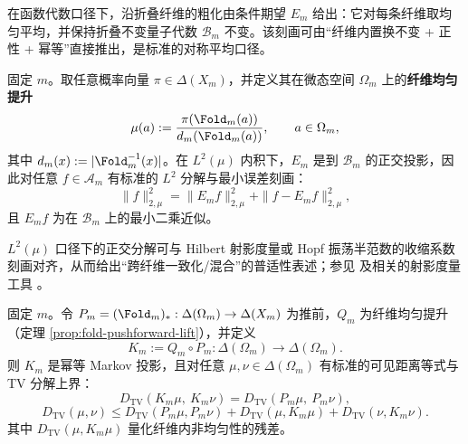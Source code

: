 在函数代数口径下，沿折叠纤维的粗化由条件期望 $E_m$ 给出：它对每条纤维取均匀平均，并保持折叠不变量子代数 $\mathcal{B}_m$ 不变。该刻画可由“纤维内置换不变 + 正性 + 幂等”直接推出，是标准的对称平均口径。

固定 $m$。取任意概率向量 $\pi\in\Delta(X_m)$，并定义其在微态空间 $\Omega_m$ 上的\textbf{纤维均匀提升}
\begin{equation}
\label{eq:pom-fiber-uniform-lift}
\mu(a):=\frac{\pi(\Fold_m(a))}{d_m(\Fold_m(a))},\qquad a\in\Omega_m,
\end{equation}
其中 $d_m(x):=|\Fold_m^{-1}(x)|$。在 $L^2(\mu)$ 内积下，$E_m$ 是到 $\mathcal{B}_m$ 的正交投影，因此对任意 $f\in\mathcal{A}_m$ 有标准的 $L^2$ 分解与最小误差刻画：
\begin{equation}
\label{eq:pom-L2-pythagoras}
\|f\|_{2,\mu}^2=\|E_m f\|_{2,\mu}^2+\|f-E_m f\|_{2,\mu}^2,
\end{equation}
且 $E_m f$ 为在 $\mathcal{B}_m$ 上的最小二乘近似。

\begin{remark}[与射影度量收缩口径的对齐]\label{rem:pom-fold-projective-metric}
$L^2(\mu)$ 口径下的正交分解可与 Hilbert 射影度量或 Hopf 振荡半范数的收缩系数刻画对齐，从而给出“跨纤维一致化/混合”的普适性表述；参见 \cite{GaubertQu2015DobrushinCones} 及相关的射影度量工具 \cite{ReebKastoryanoWolf2011HilbertProjectiveQuantum}。
\end{remark}

固定 $m$。令 $P_m=(\Fold_m)_*:\Delta(\Omega_m)\to\Delta(X_m)$ 为推前，$Q_m$ 为纤维均匀提升（定理 \ref{prop:fold-pushforward-lift}），并定义
\begin{equation}
\label{eq:pom-Km-def}
K_m:=Q_m\circ P_m:\Delta(\Omega_m)\to\Delta(\Omega_m).
\end{equation}
则 $K_m$ 是幂等 Markov 投影，且对任意 $\mu,\nu\in\Delta(\Omega_m)$ 有标准的可见距离等式与 TV 分解上界：
\begin{equation}
\label{eq:pom-tv-visible-equality}
D_{\mathrm{TV}}(K_m\mu,\ K_m\nu)=D_{\mathrm{TV}}(P_m\mu,\ P_m\nu),
\end{equation}
\begin{equation}
\label{eq:pom-tv-decomposition-upper}
D_{\mathrm{TV}}(\mu,\nu)\le D_{\mathrm{TV}}(P_m\mu,P_m\nu)+D_{\mathrm{TV}}(\mu,K_m\mu)+D_{\mathrm{TV}}(\nu,K_m\nu).
\end{equation}
其中 $D_{\mathrm{TV}}(\mu,K_m\mu)$ 量化纤维内非均匀性的残差。

